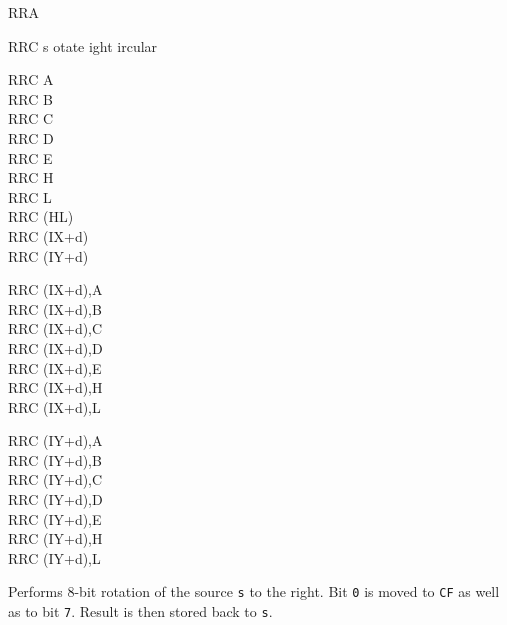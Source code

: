 \begin{basedescript}{
    \desclabelstyle{\multilinelabel}
    \desclabelwidth{3cm}}
\begin{DetailItem}{RRA}
    \end{DetailItem}

    \pagebreak
    \begin{DetailItem}{RRC s}
        {otate ight ircular}
        {}

        \begin{DetailVariants}
            RRC A\\
            RRC B\\
            RRC C\\
            RRC D\\
            RRC E\\
            RRC H\\
            RRC L\\
            RRC (HL)\\
            RRC (IX+d)\\
            RRC (IY+d)

            \columnbreak
            RRC (IX+d),A\UNDOC\\
            RRC (IX+d),B\UNDOC\\
            RRC (IX+d),C\UNDOC\\
            RRC (IX+d),D\UNDOC\\
            RRC (IX+d),E\UNDOC\\
            RRC (IX+d),H\UNDOC\\
            RRC (IX+d),L\UNDOC

            \columnbreak
            RRC (IY+d),A\UNDOC\\
            RRC (IY+d),B\UNDOC\\
            RRC (IY+d),C\UNDOC\\
            RRC (IY+d),D\UNDOC\\
            RRC (IY+d),E\UNDOC\\
            RRC (IY+d),H\UNDOC\\
            RRC (IY+d),L\UNDOC
        \end{DetailVariants}

        Performs 8-bit rotation of the source {\tt s} to the right. Bit {\tt 0} is moved to {\tt CF} as well as to bit {\tt 7}. Result is then stored back to {\tt s}.

        \begin{DetailEffects}[p]
            \FlagsRRCr
        \end{DetailEffects}
						
        \begin{DetailTiming}
        \end{DetailTiming}


\end{DetailItem}
\end{basedescript}
